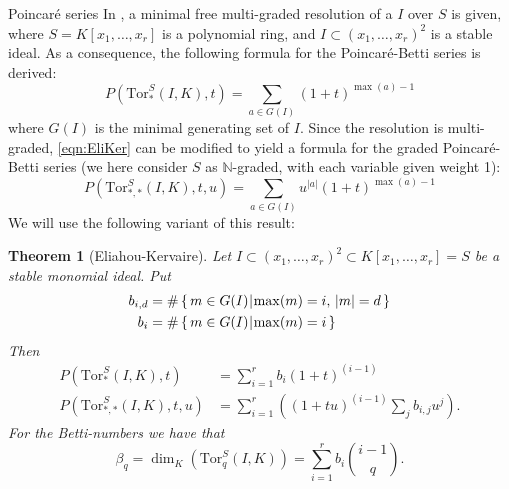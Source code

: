 \documentclass[reqno,10pt]{amsart}
\newcommand{\Tor}{\mathrm{Tor}}
\theoremstyle{definition}
\theoremstyle{remark}
\theoremstyle{plain}
\newtheorem{theorem}[definition]{Theorem}
\newtheorem{corr}[definition]{Corollary}
\newcommand{\Nat}{{\mathbb{N}}}
\def\setsuchas#1#2{\left\{\,{#1}\,\vrule\,{#2}\,\right\}}
\newcommand{\tdeg}[1]{\vert#1\rvert}
\begin{document}
\begin{section}{Poincar{\'e} series}
  In     \cite{Eliahou:MinRes}, a minimal free multi-graded resolution
  of a \(I\) over \(S\) is given, where \(S=K[x_1,\dots,x_r]\) is a
  polynomial ring, and \(I \subset (x_1,\dots,x_r)^2\) is a stable
  ideal. As a consequence, the 
  following formula for the Poincar{\'e}-Betti series  is derived: 
  \begin{equation}\label{eqn:EliKer}
    P(\Tor_{*}^{S}(I,K),t) = \sum_{a \in G(I)} (1+t)^{\max(a) - 1}    
  \end{equation}
  where \(G(I)\) is the minimal generating set of \(I\).
  Since the resolution is multi-graded, \eqref{eqn:EliKer} can be
  modified to yield a formula for the graded Poincar{\'e}-Betti series
  (we here consider \(S\) as \(\Nat\)-graded, with each variable
  given weight 1):
  \begin{equation}\label{eqn:EliKerG}
    P(\Tor_{*,*}^{S}(I,K),t,u) = \sum_{a \in G(I)}
    u^{\tdeg{a}}(1+t)^{\max(a) - 1}     
  \end{equation}
  We will use the following variant of this result:
  \begin{theorem}[Eliahou-Kervaire]
    Let \(I \subset (x_1,\dots,x_r)^2 \subset K[x_1,\dots,x_r] = S\)
    be a stable monomial ideal. 
    Put 
      \begin{align}
        b_{i,d} &= \# \setsuchas{m \in G(I)}{\max(m)=i, \, \tdeg{m}=d}
        \\ 
        b_i &= \# \setsuchas{m \in G(I)}{\max(m)=i} 
      \end{align}
    Then 
    \begin{align}
        P(\Tor_{*}^{S}(I,K),t) &= \sum_{i=1}^r b_i (1+t)^{(i-1)} \\       
        P(\Tor_{*,*}^{S}(I,K),t,u) &= \sum_{i=1}^r \left((1+tu)^{(i-1)}
         \sum_j  b_{i,j} u^{j}  \right).       
  \end{align}
  For the Betti-numbers we have that
  \begin{equation}
    \beta_q = \dim_K \left(\Tor_q^S(I,K)\right) = \sum_{i=1}^r b_i
    \binom{i-1}{q}. 
  \end{equation}
\end{theorem}



\end{section}
\end{document}
